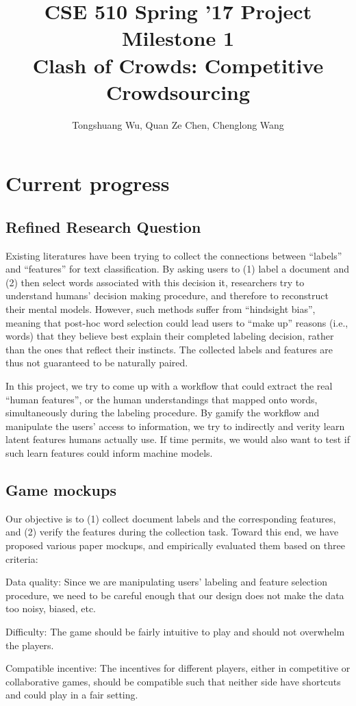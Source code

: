 \documentclass{article}
\title{{\large{CSE 510 Spring '17 Project Milestone 1}}
\\ \textbf{Clash of Crowds: Competitive Crowdsourcing}}
\author{Tongshuang Wu, Quan Ze Chen, Chenglong Wang}
\date{}
\begin{document}
\maketitle


\section{Current progress}

\subsection{Refined Research Question}

Existing literatures have been trying to collect the connections between  ``labels'' and ``features'' for text classification. 
By asking users to (1) label a document and (2) then select words associated with this decision it, researchers try to understand humans' decision making procedure, and therefore to reconstruct their mental models.
However, such methods suffer from ``hindsight bias'', meaning that post-hoc word selection could lead users to ``make up'' reasons (i.e., words) that they believe best explain their completed labeling decision, rather than the ones that reflect their instincts.
The collected labels and features are thus not guaranteed to be naturally paired.

In this project, we try to come up with a workflow that could extract the real ``human features'', or the human understandings that mapped onto words, simultaneously during the labeling procedure.
By gamify the workflow and manipulate the users' access to information, we try to indirectly and verity learn latent features humans actually use.
If time permits, we would also want to test if such learn features could inform machine models.

\subsection{Game mockups}
\label{sec:mockup}
Our objective is to (1) collect document labels and the corresponding features, and (2) verify the features during the collection task.
Toward this end, we have proposed various paper mockups, and empirically evaluated them based on three criteria:
\begin{compactitem}
	\item Data quality: Since we are manipulating users' labeling and feature selection procedure, we need to be careful enough that our design does not make the data too noisy, biased, etc.
	\item Difficulty: The game should be fairly intuitive to play and should not overwhelm the players. 
	\item Compatible incentive: The incentives for different players, either in competitive or collaborative games, should be compatible such that neither side have shortcuts and could play in a fair setting.
\end{compactitem}
 
\end{document}

